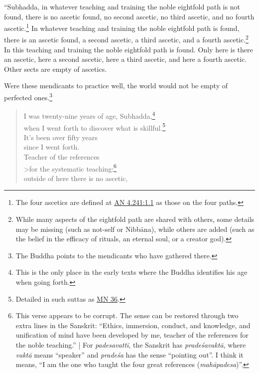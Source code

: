 \documentclass[12pt,openany]{book}%
\begin{document}
“Subhadda, in whatever teaching and training the noble eightfold path is not found, there is no ascetic found, no second ascetic, no third ascetic, and no fourth ascetic.\footnote{The four ascetics are defined at \href{https://suttacentral.net/an4.241/en/sujato\#1.1}{AN 4.241:1.1} as those on the four paths. } In whatever teaching and training the noble eightfold path is found, there is an ascetic found, a second ascetic, a third ascetic, and a fourth ascetic.\footnote{While many aspects of the eightfold path are shared with others, some details may be missing (such as not-self or \textsanskrit{Nibbāna}), while others are added (such as the belief in the efficacy of rituals, an eternal soul, or a creator god). } In this teaching and training the noble eightfold path is found. Only here is there an ascetic, here a second ascetic, here a third ascetic, and here a fourth ascetic. Other sects are empty of ascetics. 

Were these mendicants to practice well, the world would not be empty of perfected ones.\footnote{The Buddha points to the mendicants who have gathered there. } 

\begin{verse}%
I was twenty-nine years of age, Subhadda,\footnote{This is the only place in the early texts where the Buddha identifies his age when going forth. } \\
when I went forth to discover what is skillful.\footnote{Detailed in such suttas as \href{https://suttacentral.net/mn36/en/sujato}{MN 36}. } \\
It’s been over fifty years \\
since I went forth. \\
Teacher of the references \\>for the systematic teaching:\footnote{This verse appears to be corrupt. The sense can be restored through two extra lines in the Sanskrit: “Ethics, immersion, conduct, and knowledge, and unification of mind have been developed by me, teacher of the references for the noble teaching.” | For \textit{\textsanskrit{padesavattī}}, the Sanskrit has \textit{\textsanskrit{pradeśavaktā}}, where \textit{\textsanskrit{vaktā}} means “speaker” and \textit{\textsanskrit{pradeśa}} has the sense “pointing out”. I think it means, “I am the one who taught the four great references (\textit{\textsanskrit{mahāpadesa}})”. } \\
outside of here there is no ascetic, 

%
\end{verse}
\end{document}
